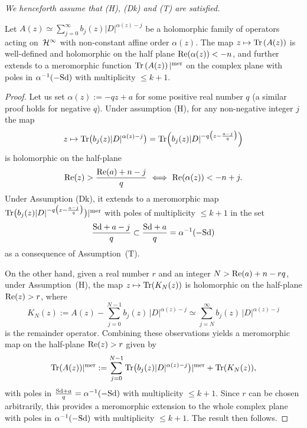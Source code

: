 \documentclass[pdftex]{sigma}
\numberwithin{equation}{section}
\begin{document}
{\it  We henceforth assume that  {\rm (H)},    {\rm (Dk)} and {\rm (T)} are satisfied.}

\begin{proposition}\label{prop:merAz} Let $A(z)\simeq
    \sum\limits_{j=0}^\infty
b_j(z) \vert D\vert^{\alpha(z)-j} $ be a holomorphic
family of operators acting on~${\cal H}^\infty$ with non-constant affine order
  $\alpha(z)$.
The map
$z\mapsto  {\rm Tr} \left( A(z)\right)$ is well-defined and holomorphic on the
half plane ${\rm Re}(\alpha(z))< -n$,  and further extends to a meromorphic
 function ${\rm Tr} \left( A(z)\right)\vert^{\rm mer}$ on
the complex plane with  poles in $\alpha^{-1}(-{\rm Sd})$ with multiplicity $\leq k+1$.
\end{proposition}

\begin{proof} Let us set $\alpha(z):= -qz+a$ for some positive real
number $q$ (a similar proof holds for negative $q$). Under assumption (H), for any non-negative integer $j$ the map
\[
 z\mapsto {\rm Tr}\big(b_j(z) \vert
  D\vert^{\alpha(z)-j}\big)= {\rm Tr}\Big(b_j(z) \vert
  D\vert^{-q \big(z-\frac{a-j}{q} \big)}\Big)
  \] is holomorphic on the
   half-plane
   \[
   {\rm Re}(z)>\frac{{\rm Re}(a)+n-j}{q} \ \Longleftrightarrow \
    {\rm Re}(\alpha(z))<-n+j.
    \]
     Under Assumption (Dk), it extends to a meromorphic map $ {\rm Tr}\big(b_j(z) \vert
  D\vert^{-q \big(z-\frac{a-j}{q}\big)}\big)\vert^{\rm mer}$
  with poles of multiplicity $\leq k+1$  in the set \[
  \frac{{\rm Sd}+a-j}{q}\subset\frac{{\rm Sd}+a}{q}= \alpha^{-1 }(-{\rm Sd})
  \] as a consequence of Assumption~(T).

 On the other hand,   given a real number $r$ and an integer $N> {\rm Re}(a)+n-rq$, under Assumption~(H),  the map  $z\mapsto {\rm Tr}(K_N(z))$ is holomorphic on the half-plane ${\rm Re}(z)>r$, where
\[
K_N(z):= A(z)-\sum_{j=0}^{N-1}b_j(z)\, \vert D\vert^{\alpha(z)-j}\simeq
\sum_{j=N}^{\infty}b_j(z)\, \vert D\vert^{\alpha(z)-j}
\] is  the remainder
operator.  Combining these observations yields a meromorphic map on the
half-plane
 ${\rm Re}(z)>r$ given by
\[
{\rm Tr} ( A(z))\vert^{\rm mer}:=  \sum_{j=0}^{N-1}
{\rm Tr} \big(b_j(z) \vert D\vert^{\alpha(z)-j}\big)\vert^{\rm mer}+ {\rm
  Tr}(K_N(z)),
   \]
   with poles in $\frac{{\rm Sd}+a}{q}= \alpha^{-1 }(-{\rm Sd})$ with multiplicity $\leq k+1$. Since $r$ can be chosen arbitrarily, this provides a meromorphic extension to the whole complex plane with poles in $\alpha^{-1 }(-{\rm Sd})$ with multiplicity $\leq k+1$. The result then
 follows. \end{proof}
\end{document}
